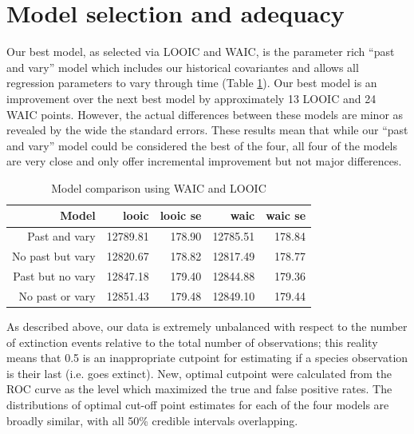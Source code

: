 \documentclass[12pt,letterpaper]{article}
\begin{document}
\section{Model selection and adequacy}

Our best model, as selected via LOOIC and WAIC, is the parameter rich ``past and vary'' model which includes our historical covariantes and allows all regression parameters to vary through time (Table \ref{tab:selection}). Our best model is an improvement over the next best model by approximately 13 LOOIC and 24 WAIC points. However, the actual differences between these models are minor as revealed by the wide the standard errors. These results mean that while our ``past and vary'' model could be considered the best of the four, all four of the models are very close and only offer incremental improvement but not major differences.
\begin{table}[ht]
  \centering
  \caption{Model comparison using WAIC and LOOIC}
  \begin{tabular}{ r r r r r }
    \hline
    Model & looic & looic se & waic & waic se \\
    \hline
    Past and vary & 12789.81 & 178.90 & 12785.51 & 178.84 \\
    No past but vary & 12820.67 & 178.82 & 12817.49 & 178.77 \\ 
    Past but no vary & 12847.18 & 179.40 & 12844.88 & 179.36 \\ 
    No past or vary & 12851.43 & 179.48 & 12849.10 & 179.44 \\ 
    \hline
  \end{tabular}
  \label{tab:selection}
\end{table}



As described above, our data is extremely unbalanced with respect to the number of extinction events relative to the total number of observations; this reality means that 0.5 is an inappropriate cutpoint for estimating if a species observation is their last (i.e. goes extinct). New, optimal cutpoint were calculated from the ROC curve as the level which maximized the true and false positive rates.
The distributions of optimal cut-off point estimates for each of the four models are broadly similar, with all 50\% credible intervals overlapping.
\end{document}

